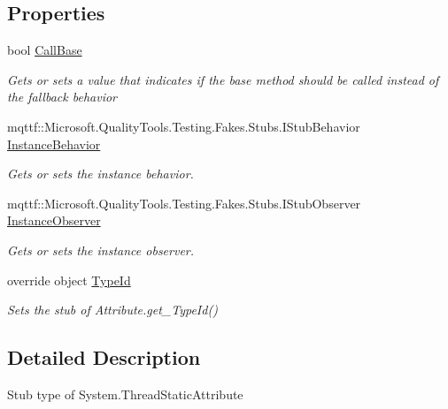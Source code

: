 \subsection*{Properties}
\begin{DoxyCompactItemize}
\item 
bool \hyperlink{class_system_1_1_fakes_1_1_stub_thread_static_attribute_ac39c0b5412489ecaebef531bc7dcd66a}{Call\-Base}
\begin{DoxyCompactList}\small\item\em Gets or sets a value that indicates if the base method should be called instead of the fallback behavior\end{DoxyCompactList}\item 
mqttf\-::\-Microsoft.\-Quality\-Tools.\-Testing.\-Fakes.\-Stubs.\-I\-Stub\-Behavior \hyperlink{class_system_1_1_fakes_1_1_stub_thread_static_attribute_ac0819584fc50b98cf9ea86deda0e5ec7}{Instance\-Behavior}
\begin{DoxyCompactList}\small\item\em Gets or sets the instance behavior.\end{DoxyCompactList}\item 
mqttf\-::\-Microsoft.\-Quality\-Tools.\-Testing.\-Fakes.\-Stubs.\-I\-Stub\-Observer \hyperlink{class_system_1_1_fakes_1_1_stub_thread_static_attribute_a13407e463a90c7516baf5099d42d19cb}{Instance\-Observer}
\begin{DoxyCompactList}\small\item\em Gets or sets the instance observer.\end{DoxyCompactList}\item 
override object \hyperlink{class_system_1_1_fakes_1_1_stub_thread_static_attribute_a5b8f9b9bb1447f0ae91a10151b84b322}{Type\-Id}
\begin{DoxyCompactList}\small\item\em Sets the stub of Attribute.\-get\-\_\-\-Type\-Id()\end{DoxyCompactList}\end{DoxyCompactItemize}


\subsection{Detailed Description}
Stub type of System.\-Thread\-Static\-Attribute



